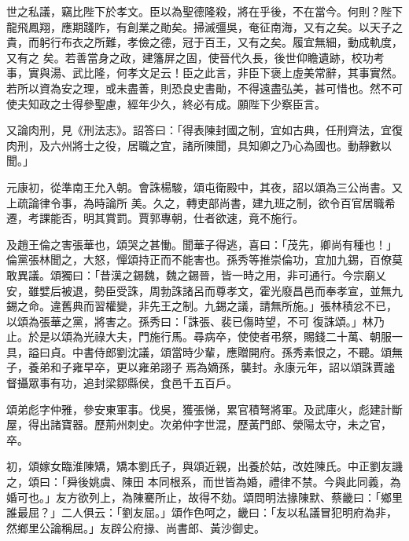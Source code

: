 \begin{pinyinscope}
 世之私議，竊比陛下於孝文。臣以為聖德隆殺，將在乎後，不在當今。何則？陛下龍飛鳳翔，應期踐阼，有創業之勛矣。掃滅彊吳，奄征南海，又有之矣。以天子之貴，而躬行布衣之所難，孝儉之德，冠于百王，又有之矣。履宜無細，動成軌度，又有之
 矣。若善當身之政，建籓屏之固，使晉代久長，後世仰瞻遺跡，校功考事，實與湯、武比隆，何孝文足云！臣之此言，非臣下褒上虛美常辭，其事實然。若所以資為安之理，或未盡善，則恐良史書勛，不得遠盡弘美，甚可惜也。然不可使夫知政之士得參聖慮，經年少久，終必有成。願陛下少察臣言。



 又論肉刑，見《刑法志》。詔答曰：「得表陳封國之制，宜如古典，任刑齊法，宜復肉刑，及六州將士之役，居職之宜，諸所陳聞，具知卿之乃心為國也。動靜數以聞。」



 元康初，從準南王允入朝。會誅楊駿，頌屯衛殿中，其夜，詔以頌為三公尚書。又上疏論律令事，為時論所
 美。久之，轉吏部尚書，建九班之制，欲令百官居職希遷，考課能否，明其賞罰。賈郭專朝，仕者欲速，竟不施行。



 及趙王倫之害張華也，頌哭之甚慟。聞華子得逃，喜曰：「茂先，卿尚有種也！」倫黨張林聞之，大怒，憚頌持正而不能害也。孫秀等推崇倫功，宜加九錫，百僚莫敢異議。頌獨曰：「昔漢之錫魏，魏之錫晉，皆一時之用，非可通行。今宗廟乂安，雖嬖后被退，勢臣受誅，周勃誅諸呂而尊孝文，霍光廢昌邑而奉孝宣，並無九錫之命。違舊典而習權變，非先王之制。九錫之議，請無所施。」張林積忿不已，以頌為張華之黨，將害之。孫秀曰：「誅張、裴已傷時望，不可
 復誅頌。」林乃止。於是以頌為光祿大夫，門施行馬。尋病卒，使使者弔祭，賜錢二十萬、朝服一具，謚曰貞。中書侍郎劉沈議，頌當時少輩，應贈開府。孫秀素恨之，不聽。頌無子，養弟和子雍早卒，更以雍弟詡子焉為嫡孫，襲封。永康元年，詔以頌誅賈謐督攝眾事有功，追封梁鄒縣侯，食邑千五百戶。



 頌弟彪字仲雅，參安東軍事。伐吳，獲張悌，累官積弩將軍。及武庫火，彪建計斷屋，得出諸寶器。歷荊州刺史。次弟仲字世混，歷黃門郎、滎陽太守，未之官，卒。



 初，頌嫁女臨淮陳矯，矯本劉氏子，與頌近親，出養於姑，改姓陳氏。中正劉友譏之，頌曰：「舜後姚虞、陳田
 本同根系，而世皆為婚，禮律不禁。今與此同義，為婚可也。」友方欲列上，為陳騫所止，故得不劾。頌問明法掾陳默、蔡畿曰：「鄉里誰最屈？」二人俱云：「劉友屈。」頌作色呵之，畿曰：「友以私議冒犯明府為非，然鄉里公論稱屈。」友辟公府掾、尚書郎、黃沙御史。




\end{pinyinscope}

